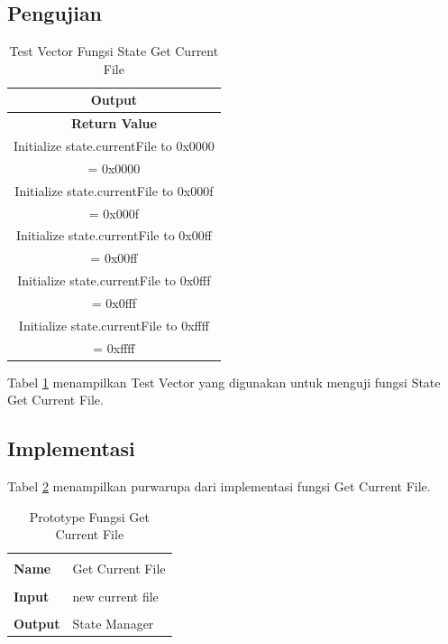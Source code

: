 \subsection {Pengujian}

\begin{table}[!h]
  \centering
  \begin{tabular}{ | c | }
    \hline
    \bf{Output} \\
    \hline
    \bf{Return Value} \\
    \hline
    Initialize state.currentFile to 0x0000 \\
    \hline
    = 0x0000 \\
    \hline
    Initialize state.currentFile to 0x000f \\
    \hline
    = 0x000f \\
    \hline
    Initialize state.currentFile to 0x00ff \\
    \hline
    = 0x00ff \\
    \hline
    Initialize state.currentFile to 0x0fff \\
    \hline
    = 0x0fff \\
    \hline
    Initialize state.currentFile to 0xffff \\
    \hline
    = 0xffff \\
    \hline
  \end{tabular}
  \caption{Test Vector Fungsi State Get Current File}
  \label{tabel-test-getcurrentfile}
\end{table}

Tabel \ref{tabel-test-getcurrentfile} menampilkan Test Vector yang digunakan untuk menguji fungsi State Get Current File.

\subsection {Implementasi}

Tabel \ref{tabel-getcurrentfile} menampilkan purwarupa dari implementasi fungsi Get Current File. 

\begin{table}[h]
  \centering
  \begin{tabular}{p{2cm} p{8cm}}
    \hline\\
    {\bf Name} & Get Current File\\
    \hline\\
    {\bf Input} & new current file
    \\
    \hline\\
    {\bf Output} & State Manager
    \\
    \hline
  \end{tabular}
  \caption{Prototype Fungsi Get Current File}
  \label{tabel-getcurrentfile}
\end{table}

